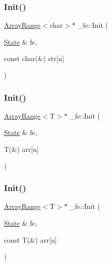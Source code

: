 \mbox{\label{namespace__fe_ac8a11e0ea804066967b5e731edd79876}} 
\subsubsection{\texorpdfstring{Init()}{Init()}\hspace{0.1cm}{\footnotesize\ttfamily [4/6]}}
{\footnotesize\ttfamily \mbox{\hyperlink{struct__fe_1_1ArrayRange}{Array\+Range}}$<$char$>$$\ast$ \+\_\+fe\+::\+Init (\begin{DoxyParamCaption}\item[{\mbox{\hyperlink{struct__fe_1_1State}{State}} \&}]{fe,  }\item[{const char(\&)}]{str\mbox{[}n\mbox{]} }\end{DoxyParamCaption})}

\mbox{\label{namespace__fe_a0de0f309238a8bd2fd46faec6164f1e7}} 
\subsubsection{\texorpdfstring{Init()}{Init()}\hspace{0.1cm}{\footnotesize\ttfamily [5/6]}}
{\footnotesize\ttfamily \mbox{\hyperlink{struct__fe_1_1ArrayRange}{Array\+Range}}$<$T$>$$\ast$ \+\_\+fe\+::\+Init (\begin{DoxyParamCaption}\item[{\mbox{\hyperlink{struct__fe_1_1State}{State}} \&}]{fe,  }\item[{T(\&)}]{arr\mbox{[}n\mbox{]} }\end{DoxyParamCaption})}

\mbox{\label{namespace__fe_ae66d437a50aae83e14008aa3dc16cd3c}} 
\subsubsection{\texorpdfstring{Init()}{Init()}\hspace{0.1cm}{\footnotesize\ttfamily [6/6]}}
{\footnotesize\ttfamily \mbox{\hyperlink{struct__fe_1_1ArrayRange}{Array\+Range}}$<$T$>$$\ast$ \+\_\+fe\+::\+Init (\begin{DoxyParamCaption}\item[{\mbox{\hyperlink{struct__fe_1_1State}{State}} \&}]{fe,  }\item[{const T(\&)}]{arr\mbox{[}n\mbox{]} }\end{DoxyParamCaption})}

